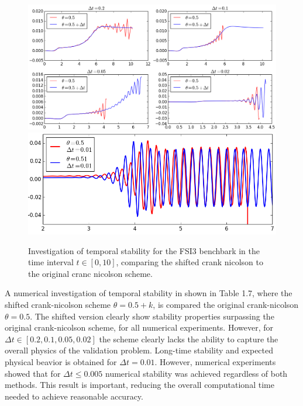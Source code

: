 \newpage

\begin{figure}[h!]
 	\centering
    \includegraphics[scale=0.6]{./Fig/thetacheck.png} \\
    \vspace{2cm}
    \includegraphics[scale=0.6]{./Fig/besttheta.png}
      \caption{Investigation of temporal stability for the FSI3 benchbark in the time interval $t \in [0, 10]$, comparing the shifted crank nicolson to the original cranc nicolson scheme. }
\end{figure}

A numerical investigation of temporal stability in shown in Table 1.7, where the shifted crank-nicolson scheme $\theta = 0.5 + k$, is compared the original crank-nicolson $\theta = 0.5$. The shifted version clearly show stability properties surpassing the original crank-nicolson scheme, for all numerical experiments. However, for $\Delta t \in [0.2, 0.1, 0.05, 0.02]$ the scheme clearly lacks the ability to capture the overall physics of the validation problem. Long-time stability and expected physical beavior is obtained for $\Delta t = 0.01$. However, numerical experiments showed that for $\Delta t \leq 0.005$ numerical stability was achieved regardless of both methods. This result is important, reducing the overall computational time needed to achieve reasonable accuracy.


